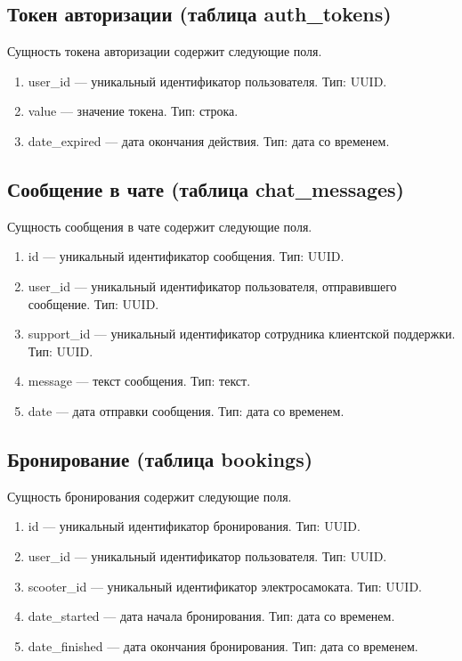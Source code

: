 \subsection{Токен авторизации (таблица auth\_tokens)}

Сущность токена авторизации содержит следующие поля.

\begin{enumerate}
    \item user\_id --- уникальный идентификатор пользователя. Тип: UUID.
    \item value --- значение токена. Тип: строка.
    \item date\_expired --- дата окончания действия. Тип: дата со временем.
\end{enumerate}

\subsection{Сообщение в чате (таблица chat\_messages)}

Сущность сообщения в чате содержит следующие поля.

\begin{enumerate}
    \item id --- уникальный идентификатор сообщения. Тип: UUID.
    \item user\_id --- уникальный идентификатор пользователя, отправившего сообщение. Тип: UUID.
    \item support\_id --- уникальный идентификатор сотрудника клиентской поддержки. Тип: UUID.
    \item message --- текст сообщения. Тип: текст.
    \item date --- дата отправки сообщения. Тип: дата со временем.
\end{enumerate}

\subsection{Бронирование (таблица bookings)}

Сущность бронирования содержит следующие поля.

\begin{enumerate}
    \item id --- уникальный идентификатор бронирования. Тип: UUID.
    \item user\_id --- уникальный идентификатор пользователя. Тип: UUID.
    \item scooter\_id --- уникальный идентификатор электросамоката. Тип: UUID.
    \item date\_started --- дата начала бронирования. Тип: дата со временем.
    \item date\_finished --- дата окончания бронирования. Тип: дата со временем.
\end{enumerate}


